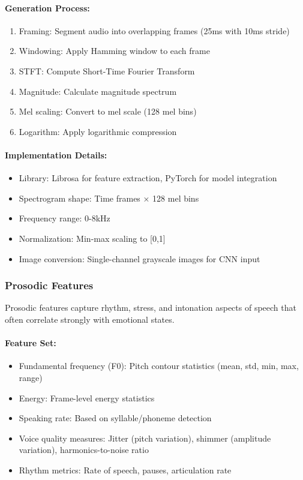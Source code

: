 \documentclass[12pt]{article}
\begin{document}
\paragraph{Generation Process:}
\begin{enumerate}
    \item Framing: Segment audio into overlapping frames (25ms with 10ms stride)
    \item Windowing: Apply Hamming window to each frame
    \item STFT: Compute Short-Time Fourier Transform
    \item Magnitude: Calculate magnitude spectrum
    \item Mel scaling: Convert to mel scale (128 mel bins)
    \item Logarithm: Apply logarithmic compression
\end{enumerate}

\paragraph{Implementation Details:}
\begin{itemize}
    \item Library: Librosa for feature extraction, PyTorch for model integration
    \item Spectrogram shape: Time frames × 128 mel bins
    \item Frequency range: 0-8kHz
    \item Normalization: Min-max scaling to [0,1]
    \item Image conversion: Single-channel grayscale images for CNN input
\end{itemize}

\subsubsection{Prosodic Features}
Prosodic features capture rhythm, stress, and intonation aspects of speech that often correlate strongly with emotional states.

\paragraph{Feature Set:}
\begin{itemize}
    \item Fundamental frequency (F0): Pitch contour statistics (mean, std, min, max, range)
    \item Energy: Frame-level energy statistics
    \item Speaking rate: Based on syllable/phoneme detection
    \item Voice quality measures: Jitter (pitch variation), shimmer (amplitude variation), harmonics-to-noise ratio
    \item Rhythm metrics: Rate of speech, pauses, articulation rate
\end{itemize}
\end{document}
